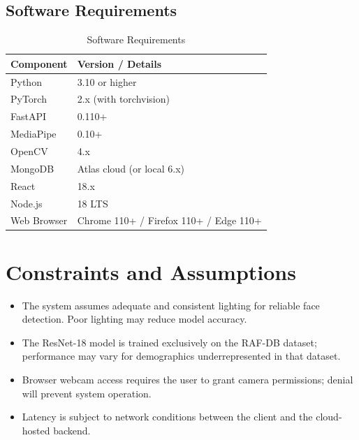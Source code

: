 \subsection{Software Requirements}

\begin{table}[H]
\centering
\caption{Software Requirements}
\begin{tabular}{ll}
\toprule
\textbf{Component}      & \textbf{Version / Details} \\
\midrule
Python                  & 3.10 or higher \\
PyTorch                 & 2.x (with torchvision) \\
FastAPI                 & 0.110+ \\
MediaPipe               & 0.10+ \\
OpenCV                  & 4.x \\
MongoDB                 & Atlas cloud (or local 6.x) \\
React                   & 18.x \\
Node.js                 & 18 LTS \\
Web Browser             & Chrome 110+ / Firefox 110+ / Edge 110+ \\
\bottomrule
\end{tabular}
\end{table}

\section{Constraints and Assumptions}

\begin{itemize}
    \item The system assumes adequate and consistent lighting for reliable
          face detection. Poor lighting may reduce model accuracy.
    \item The ResNet-18 model is trained exclusively on the RAF-DB dataset;
          performance may vary for demographics underrepresented in that
          dataset.
    \item Browser webcam access requires the user to grant camera
          permissions; denial will prevent system operation.
    \item Latency is subject to network conditions between the client and
          the cloud-hosted backend.
\end{itemize}
